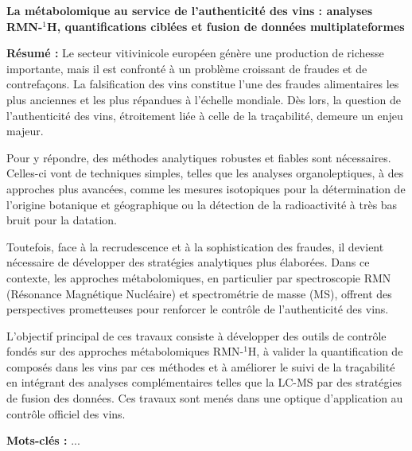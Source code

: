 \begin{small}
{
\linespread{1.05}\selectfont
\begin{center}
\textbf{La métabolomique au service de l’authenticité des vins : analyses RMN-$^1$H, quantifications ciblées et fusion de données multiplateformes}
\end{center}

\noindent\textbf{Résumé :} %
Le secteur vitivinicole européen génère une production de richesse importante, mais il est confronté à un problème croissant de fraudes et de contrefaçons. La falsification des vins constitue l’une des fraudes alimentaires les plus anciennes et les plus répandues à l’échelle mondiale. Dès lors, la question de l’authenticité des vins, étroitement liée à celle de la traçabilité, demeure un enjeu majeur.

Pour y répondre, des méthodes analytiques robustes et fiables sont nécessaires. Celles-ci vont de techniques simples, telles que les analyses organoleptiques, à des approches plus avancées, comme les mesures isotopiques pour la détermination de l’origine botanique et géographique ou la détection de la radioactivité à très bas bruit pour la datation.

Toutefois, face à la recrudescence et à la sophistication des fraudes, il devient nécessaire de développer des stratégies analytiques plus élaborées. Dans ce contexte, les approches métabolomiques, en particulier par spectroscopie RMN (Résonance Magnétique Nucléaire) et spectrométrie de masse (MS), offrent des perspectives prometteuses pour renforcer le contrôle de l’authenticité des vins.

L’objectif principal de ces travaux consiste à développer des outils de contrôle fondés sur des approches métabolomiques RMN-$^1$H, à valider la quantification de composés dans les vins par ces méthodes et à améliorer le suivi de la traçabilité en intégrant des analyses complémentaires telles que la LC-MS par des stratégies de fusion des données. Ces travaux sont menés dans une optique d’application au contrôle officiel des vins.

\vspace{0.8\baselineskip} %
\noindent\textbf{Mots-clés :} ...

\vspace{0.6\baselineskip}
\noindent\makebox[\linewidth]{\rule{\textwidth}{0.4pt}}
\vspace{0.6\baselineskip}

}
\end{small}
